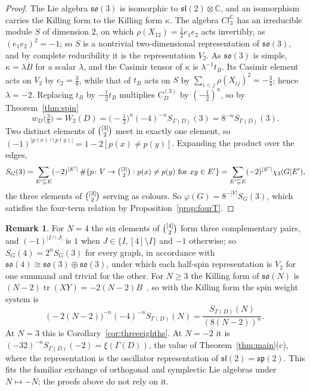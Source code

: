 \documentclass[11pt,a4paper,reqno]{amsart}
\theoremstyle{definition}
\newtheorem{remark}[theorem]{Remark}
\newcommand{\slt}{\mathfrak{sl}(2)}
\newcommand{\tr}{\operatorname{tr}}
\newcommand{\binomset}[2]{\tbinom{#1}{#2}}
\begin{document}
\begin{proof}
The Lie algebra $\mathfrak{so}(3)$ is isomorphic to $\slt\otimes\mathbb C$, and an isomorphism carries the Killing form to the Killing form $\kappa$. The algebra $Cl_3^{\mathbb C}$ has an irreducible module $S$ of dimension $2$, on which $\rho(X_{12})=\frac12e_1e_2$ acts invertibly, as $(e_1e_2)^2=-1$; so $S$ is a nontrivial two-dimensional representation of $\mathfrak{so}(3)$, and by complete reducibility it is the representation $V_2$. As $\mathfrak{so}(3)$ is simple, $\kappa=\lambda B$ for a scalar $\lambda$, and the Casimir tensor of $\kappa$ is $\lambda^{-1}t_B$. Its Casimir element acts on $V_2$ by $c_2=\frac38$, while that of $t_B$ acts on $S$ by $\sum_{i<j}\rho(X_{ij})^2=-\frac34$; hence $\lambda=-2$. Replacing $t_B$ by $-\frac12t_B$ multiplies $C^{(3)}_D$ by $(-\frac12)^n$, so by Theorem~\ref{thm:spin}
\[
w_D\bigl(\tfrac38\bigr)=W_2(D)=\bigl(-\tfrac12\bigr)^n(-4)^{-n}S_{\Gamma(D)}(3)=8^{-n}S_{\Gamma(D)}(3).
\]
Two distinct elements of $\binomset{[3]}{2}$ meet in exactly one element, so $(-1)^{|p(x)\cap p(y)|}=1-2[p(x)\ne p(y)]$. Expanding the product over the edges,
\[
S_G(3)=\sum_{E'\subseteq E}(-2)^{|E'|}\,\#\{p\colon V\to\tbinom{[3]}{2}:p(x)\ne p(y)\text{ for }xy\in E'\}=\sum_{E'\subseteq E}(-2)^{|E'|}\chi_3(G|E'),
\]
the three elements of $\binomset{[3]}{2}$ serving as colours. So $\varphi(G)=8^{-|V|}S_G(3)$, which satisfies the four-term relation by Proposition~\ref{prop:fourT}.
\end{proof}

\begin{remark}\label{rem:minustwo}
For $N=4$ the six elements of $\binomset{[4]}{2}$ form three complementary pairs, and $(-1)^{|I\cap J|}$ is $1$ when $J\in\{I,[4]\setminus I\}$ and $-1$ otherwise; so $S_G(4)=2^nS_G(3)$ for every graph, in accordance with $\mathfrak{so}(4)\cong\mathfrak{so}(3)\oplus\mathfrak{so}(3)$, under which each half-spin representation is $V_2$ for one summand and trivial for the other. For $N\ge3$ the Killing form of $\mathfrak{so}(N)$ is $(N-2)\tr(XY)=-2(N-2)B$~\cite{FH91}, so with the Killing form the spin weight system is
\[
\bigl(-2(N-2)\bigr)^{-n}(-4)^{-n}S_{\Gamma(D)}(N)=\frac{S_{\Gamma(D)}(N)}{(8(N-2))^n}.
\]
At $N=3$ this is Corollary~\ref{cor:threeeighths}. At $N=-2$ it is $(-32)^{-n}S_{\Gamma(D)}(-2)=\xi(\Gamma(D))$, the value of Theorem~\ref{thm:main}(c), where the representation is the oscillator representation of $\slt=\mathfrak{sp}(2)$. This fits the familiar exchange of orthogonal and symplectic Lie algebras under $N\mapsto-N$; the proofs above do not rely on it.
\end{remark}
\end{document}

